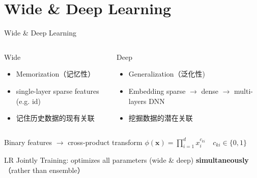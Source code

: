 \documentclass{ctexbeamer}
\begin{document}
\section{Wide \& Deep Learning}
\begin{frame}{Wide \& Deep Learning }
\begin{columns}
	\begin{block}{Wide}
		\begin{itemize}
			\item Memorization（记忆性）
			\item single-layer sparse features (e.g. id)
			\item 记住历史数据的现有关联
		\end{itemize}
	\end{block}
	\begin{block}{Deep}
		\begin{itemize}
			\item Generalization（泛化性)
			\item Embedding sparse $\to$ dense $\to$ multi-layers DNN
			\item 挖掘数据的潜在关联
		\end{itemize}
	\end{block}
	\end{columns}
	\begin{block}{Binary features $\to$ cross-product transform}
		$\phi (\mathbf{x}) = \prod_{i=1}^{d} {x_i^{c_{ki}}} \quad c_{ki} \in \{0,1\}$
	\end{block}
	\begin{block}{LR}
		Jointly Training: optimizes all parameters (wide \& deep) {\textbf{simultaneously}} （rather than ensemble）
	\end{block}
\end{frame}
\end{document}
